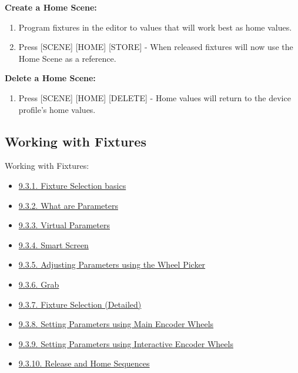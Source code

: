 \documentclass[
]{article}
\providecommand{\tightlist}{%
  \setlength{\itemsep}{0pt}\setlength{\parskip}{0pt}}
\begin{document}
\textbf{Create a Home Scene:}

\begin{enumerate}
\def\labelenumi{\arabic{enumi}.}
\item
  Program fixtures in the editor to values that will work best as home values.
\item
  Press {[}SCENE{]} {[}HOME{]} {[}STORE{]} - When released fixtures will now use the Home Scene as a reference.
\end{enumerate}

\textbf{Delete a Home Scene:}

\begin{enumerate}
\def\labelenumi{\arabic{enumi}.}
\tightlist
\item
  Press {[}SCENE{]} {[}HOME{]} {[}DELETE{]} - Home values will return to the device profile's home values.
\end{enumerate}

\hypertarget{working-with-fixtures}{%
\subsection{Working with Fixtures}\label{working-with-fixtures}}

Working with Fixtures:

\begin{itemize}
\item
  \href{https://vibemanual.compulite.com/programming-basics.html\#fixture-selection-basics}{9.3.1. Fixture Selection basics}
\item
  \href{https://vibemanual.compulite.com/programming-basics.html\#what-are-parameters}{9.3.2. What are Parameters}
\item
  \href{https://vibemanual.compulite.com/programming-basics.html\#virtual-parameters}{9.3.3. Virtual Parameters}
\item
  \href{https://vibemanual.compulite.com/programming-basics.html\#smart-screen-1}{9.3.4. Smart Screen}
\item
  \href{https://vibemanual.compulite.com/programming-basics.html\#adjusting-parameters-using-the-wheel-picker}{9.3.5. Adjusting Parameters using the Wheel Picker}
\item
  \href{https://vibemanual.compulite.com/programming-basics.html\#grab}{9.3.6. Grab}
\item
  \href{https://vibemanual.compulite.com/programming-basics.html\#fixture-selection-detailed}{9.3.7. Fixture Selection (Detailed)}
\item
  \href{https://vibemanual.compulite.com/programming-basics.html\#setting-parameters-using-main-encoder-wheels}{9.3.8. Setting Parameters using Main Encoder Wheels}
\item
  \href{https://vibemanual.compulite.com/programming-basics.html\#setting-parameters-using-interactive-encoder-wheels}{9.3.9. Setting Parameters using Interactive Encoder Wheels}
\item
  \href{https://vibemanual.compulite.com/programming-basics.html\#release-and-home-sequences}{9.3.10. Release and Home Sequences}
\end{itemize}
\end{document}
